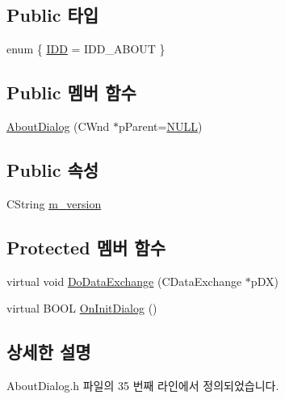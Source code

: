 \subsection*{Public 타입}
\begin{DoxyCompactItemize}
\item 
enum \{ \mbox{\hyperlink{class_about_dialog_ad39ef53347d21ec0cb70ff40df557e61a5abcac78e55566777388160cfcf0112c}{I\+DD}} = I\+D\+D\+\_\+\+A\+B\+O\+UT
 \}
\end{DoxyCompactItemize}
\subsection*{Public 멤버 함수}
\begin{DoxyCompactItemize}
\item 
\mbox{\hyperlink{class_about_dialog_a4a8056094af91d12bca94d4fcba1aeae}{About\+Dialog}} (C\+Wnd $\ast$p\+Parent=\mbox{\hyperlink{_system_8h_a070d2ce7b6bb7e5c05602aa8c308d0c4}{N\+U\+LL}})
\end{DoxyCompactItemize}
\subsection*{Public 속성}
\begin{DoxyCompactItemize}
\item 
C\+String \mbox{\hyperlink{class_about_dialog_a78e658a0c2d03632ce86a675b89d8492}{m\+\_\+version}}
\end{DoxyCompactItemize}
\subsection*{Protected 멤버 함수}
\begin{DoxyCompactItemize}
\item 
virtual void \mbox{\hyperlink{class_about_dialog_a098f0327b766a8c3fff0fef3076dc9eb}{Do\+Data\+Exchange}} (C\+Data\+Exchange $\ast$p\+DX)
\item 
virtual B\+O\+OL \mbox{\hyperlink{class_about_dialog_ab42eeca93160e48d480b004aaf33c353}{On\+Init\+Dialog}} ()
\end{DoxyCompactItemize}


\subsection{상세한 설명}


About\+Dialog.\+h 파일의 35 번째 라인에서 정의되었습니다.



